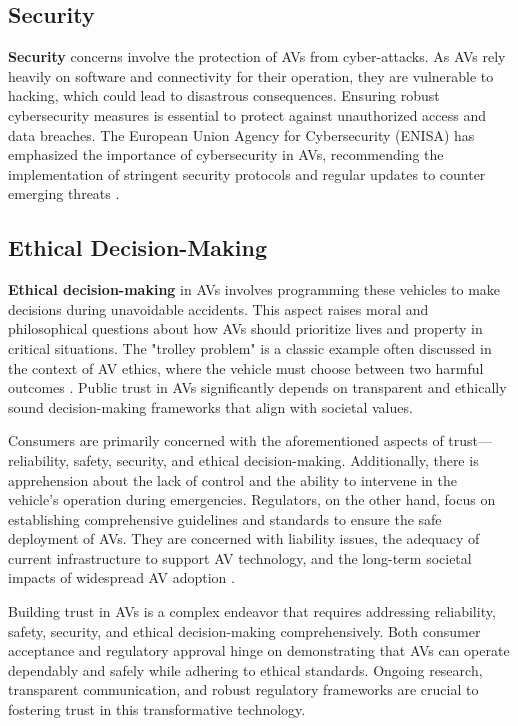 \subsection{Security}
\textbf{Security} concerns involve the protection of AVs from cyber-attacks. As AVs rely heavily on software and connectivity for their operation, they are vulnerable to hacking, which could lead to disastrous consequences. Ensuring robust cybersecurity measures is essential to protect against unauthorized access and data breaches. The European Union Agency for Cybersecurity (ENISA) has emphasized the importance of cybersecurity in AVs, recommending the implementation of stringent security protocols and regular updates to counter emerging threats \cite{enisa2020}.

\subsection{Ethical Decision-Making}
\textbf{Ethical decision-making} in AVs involves programming these vehicles to make decisions during unavoidable accidents. This aspect raises moral and philosophical questions about how AVs should prioritize lives and property in critical situations. The "trolley problem" is a classic example often discussed in the context of AV ethics, where the vehicle must choose between two harmful outcomes \cite{lin2015}. Public trust in AVs significantly depends on transparent and ethically sound decision-making frameworks that align with societal values.

Consumers are primarily concerned with the aforementioned aspects of trust—reliability, safety, security, and ethical decision-making. Additionally, there is apprehension about the lack of control and the ability to intervene in the vehicle’s operation during emergencies. Regulators, on the other hand, focus on establishing comprehensive guidelines and standards to ensure the safe deployment of AVs. They are concerned with liability issues, the adequacy of current infrastructure to support AV technology, and the long-term societal impacts of widespread AV adoption \cite{litman2020}.

Building trust in AVs is a complex endeavor that requires addressing reliability, safety, security, and ethical decision-making comprehensively. Both consumer acceptance and regulatory approval hinge on demonstrating that AVs can operate dependably and safely while adhering to ethical standards. Ongoing research, transparent communication, and robust regulatory frameworks are crucial to fostering trust in this transformative technology.

